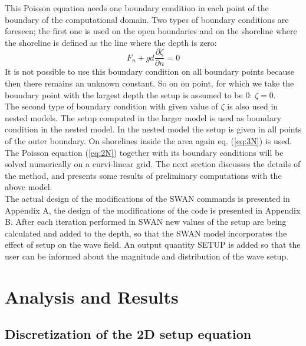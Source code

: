 \documentclass[12pt]{book}
\begin{document}
This Poisson equation needs one boundary condition in each point of the boundary
of the computational domain. Two types of boundary conditions are foreseen; the
first one is used on the open boundaries and on the shoreline where the shoreline
is defined as the line where the depth is zero:
\begin{equation}
F_{n} + gd \frac{\partial \zeta}{\partial n} = 0
\label{eq:3N}
\end{equation}
It is not possible to use this boundary condition on all boundary points because
then there remains an unknown constant. So on on point, for which we take the
boundary point with the largest depth the setup is assumed to be 0:
$\zeta=0$.
\\[2ex]
\noindent
The second type of boundary condition with given value of $\zeta$ is also used in nested
models. The setup computed in the larger model is used as boundary condition in
the nested model. In the nested model the setup  is given in all points of the outer
boundary. On shorelines inside the area again eq. (\ref{eq:3N}) is used.
\\[2ex]
\noindent
The Poisson equation (\ref{eq:2N}) together with its boundary conditions will be solved
numerically on a curvi-linear grid. The next section discusses the details of the
method, and presents some results of preliminary computations with the above
model.
\\[2ex]
\noindent
The actual design of the modifications of the SWAN commands is presented in
Appendix A, the design of the modifications of the code is presented in Appendix
B. After each iteration performed in SWAN new values of the setup are being
calculated and added to the depth, so that the SWAN model incorporates the effect
of setup on the wave field. An output quantity SETUP is added so that the user can
be informed about the magnitude and distribution of the wave setup.
\\[2ex]
\noindent
\section{Analysis and Results}
\subsection{Discretization of the 2D setup equation}
\label{sec1G}
%
\end{document}
